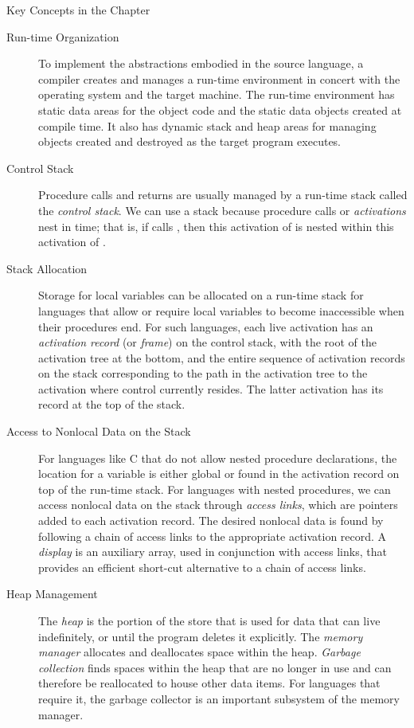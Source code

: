 \begin{bibunit}[apalike]
\begin{frame}[t,allowframebreaks]{Key Concepts in the Chapter}
	\begin{small}
	\begin{description}
	\item[Run-time Organization] To implement the abstractions embodied in the source language, a compiler creates and manages a run-time environment in concert with the operating system and the target machine. The run-time environment has static data areas for the object code and the static data objects created at compile time. It also has dynamic stack and heap areas for managing objects created and destroyed as the target program executes.
	\item[Control Stack]  Procedure calls and returns are usually managed by a run-time stack called the \emph{control stack}. We can use a stack because procedure calls or \emph{activations} nest in time; that is, if  calls , then this activation of  is nested within this activation of .
	\item[Stack Allocation] Storage for local variables can be allocated on a run-time stack for languages that allow or require local variables to become inaccessible when their procedures end. For such languages, each live activation has an \emph{activation record} (or \emph{frame}) on the control stack, with the root of the activation tree at the bottom, and the entire sequence of activation records on the stack corresponding to the path in the activation tree to the activation where control currently resides. The latter activation has its record at the top of the stack.
	\item[Access to Nonlocal Data on the Stack] For languages like C that do not allow nested procedure declarations, the location for a variable is either global or found in the activation record on top of the run-time stack. For languages with nested procedures, we can access nonlocal data on the stack through \emph{access links}, which are pointers added to each activation record. The desired nonlocal data is found by following a chain of access links to the appropriate activation record. A \emph{display} is an auxiliary array, used in conjunction with access links, that provides an efficient short-cut alternative to a chain of access links.
	\item[Heap Management] The \emph{heap} is the portion of the store that is used for data that can live indefinitely, or until the program deletes it explicitly. The \emph{memory manager} allocates and deallocates space within the heap. \emph{Garbage collection} finds spaces within the heap that are no longer in use and can therefore be reallocated to house other data items. For languages that require it, the garbage collector is an important subsystem of the memory manager.

\end{description}
\end{small}
\end{frame}
\end{bibunit}
